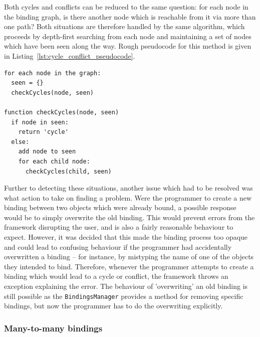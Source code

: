 \documentclass[12pt,twoside,notitlepage]{report}
\begin{document}
Both cycles and conflicts can be reduced to the same question: for each node in the binding graph, is there another node which is reachable from it via more than one path? Both situations are therefore handled by the same algorithm, which proceeds by depth-first searching from each node and maintaining a set of nodes which have been seen along the way. Rough pseudocode for this method is given in Listing~\ref{lst:cycle_conflict_pseudocode}.

\begin{lstlisting}[caption={Pseudocode for cycle and conflict detection}, label=lst:cycle_conflict_pseudocode]
for each node in the graph:
  seen = {}
  checkCycles(node, seen)

function checkCycles(node, seen)
  if node in seen:
    return 'cycle'
  else:
    add node to seen
    for each child node:
      checkCycles(child, seen)
\end{lstlisting}

Further to detecting these situations, another issue which had to be resolved was what action to take on finding a problem. Were the programmer to create a new binding between two objects which were already bound, a possible response would be to simply overwrite the old binding. This would prevent errors from the framework disrupting the user, and is also a fairly reasonable behaviour to expect. However, it was decided that this made the binding process too opaque and could lead to confusing behaviour if the programmer had accidentally overwritten a binding -- for instance, by mistyping the name of one of the objects they intended to bind. Therefore, whenever the programmer attempts to create a binding which would lead to a cycle or conflict, the framework throws an exception explaining the error. The behaviour of 'overwriting' an old binding is still possible as the \texttt{BindingsManager} provides a method for removing specific bindings, but now the programmer has to do the overwriting explicitly.

\subsubsection{Many-to-many bindings}
\end{document}
